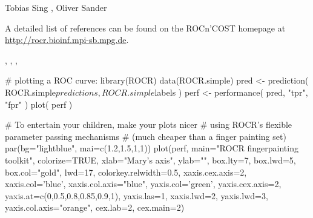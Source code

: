 \begin{Author}\relax
Tobias Sing ,
Oliver Sander 
\end{Author}
\begin{References}\relax
A detailed list of references can be found on the ROCn'COST
homepage at \url{http://rocr.bioinf.mpi-sb.mpg.de}.
\end{References}
\begin{SeeAlso}\relax
{}, ,
, 
\end{SeeAlso}
\begin{Examples}
\begin{ExampleCode}
# plotting a ROC curve:
library(ROCR)
data(ROCR.simple)
pred <- prediction( ROCR.simple$predictions, ROCR.simple$labels )
perf <- performance( pred, "tpr", "fpr" )
plot( perf )

# To entertain your children, make your plots nicer
# using ROCR's flexible parameter passing mechanisms
# (much cheaper than a finger painting set)
par(bg="lightblue", mai=c(1.2,1.5,1,1))
plot(perf, main="ROCR fingerpainting toolkit", colorize=TRUE,
  xlab="Mary's axis", ylab="", box.lty=7, box.lwd=5,
  box.col="gold", lwd=17, colorkey.relwidth=0.5, xaxis.cex.axis=2,
  xaxis.col='blue', xaxis.col.axis="blue", yaxis.col='green', yaxis.cex.axis=2,
  yaxis.at=c(0,0.5,0.8,0.85,0.9,1), yaxis.las=1, xaxis.lwd=2, yaxis.lwd=3,
  yaxis.col.axis="orange", cex.lab=2, cex.main=2)
\end{ExampleCode}
\end{Examples}

